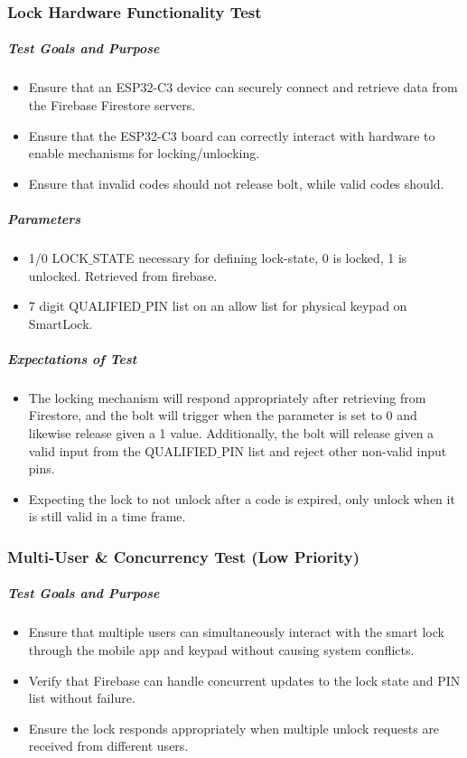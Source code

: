 \subsubsection{Lock Hardware Functionality Test}
\subparagraph{Test Goals and Purpose}
\begin{itemize}
    \item Ensure that an ESP32-C3 device can securely connect and retrieve data from the Firebase Firestore servers.
    \item Ensure that the ESP32-C3 board can correctly interact with hardware to enable mechanisms for locking/unlocking.
    \item Ensure that invalid codes should not release bolt, while valid codes should.
\end{itemize}


\subparagraph{Parameters}
\begin{itemize}
    \item 1/0 LOCK$\_$STATE necessary for defining lock-state, 0 is locked, 1 is unlocked. Retrieved from firebase.
    \item 7 digit QUALIFIED$\_$PIN list on an allow list for physical keypad on SmartLock.
\end{itemize}

\subparagraph{Expectations of Test}
\begin{itemize}
    \item The locking mechanism will respond appropriately after retrieving from Firestore, and the bolt will trigger when the parameter is set to 0 and likewise release given a 1 value. Additionally, the bolt will release given a valid input from the QUALIFIED$\_$PIN list and reject other non-valid input pins.
    \item Expecting the lock to not unlock after a code is expired, only unlock when it is still valid in a time frame.
\end{itemize}

\subsubsection{Multi-User \& Concurrency Test (Low Priority)}
\subparagraph{Test Goals and Purpose}
\begin{itemize}
    \item Ensure that multiple users can simultaneously interact with the smart lock through the mobile app and keypad without causing system conflicts.
    \item Verify that Firebase can handle concurrent updates to the lock state and PIN list without failure.
    \item Ensure the lock responds appropriately when multiple unlock requests are received from different users.
\end{itemize}


